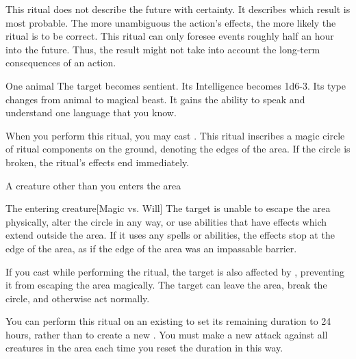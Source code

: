 This ritual does not describe the future with certainty. It describes which result is most probable. The more unambiguous the action's effects, the more likely the ritual is to be correct.
\spellnotes This ritual can only foresee events roughly half an hour into the future. Thus, the result might not take into account the long-term consequences of an action.

\begin{spelltarget}{One animal}
    \spelleffect The target becomes sentient. Its Intelligence becomes 1d6-3. Its type changes from animal to magical beast. It gains the ability to speak and understand one language that you know.
\end{spelltarget}

\spellspecial When you perform this ritual, you may cast .
\spellline
\spelleffect This ritual inscribes a magic circle of ritual components on the ground, denoting the edges of the area. If the circle is broken, the ritual's effects end immediately.
\begin{spelltrigger}{A creature other than you enters the area}
    \begin{spelltarget}{The entering creature}[Magic vs. Will]
        \spellsuccess The target is unable to escape the area physically, alter the circle in any way, or use abilities that have effects which extend outside the area. If it uses any spells or abilities, the effects stop at the edge of the area, as if the edge of the area was an impassable barrier.

        If you cast  while performing the ritual, the target is also affected by , preventing it from escaping the area magically.
        \spellfailure The target can leave the area, break the circle, and otherwise act normally.
    \end{spelltarget}
\end{spelltrigger}

\spellnotes You can perform this ritual on an existing  to set its remaining duration to 24 hours, rather than to create a new . You must make a new attack against all creatures in the area each time you reset the duration in this way.

